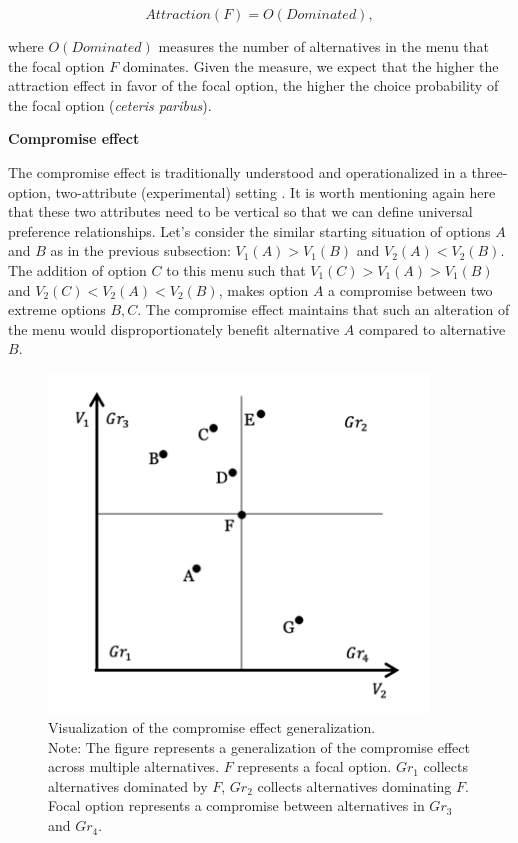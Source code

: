 \documentclass[a4paper,12pt]{article}
\begin{document}
$$Attraction(F)=O(Dominated),$$

where $O(Dominated)$ measures the number of alternatives in the menu that the focal option $F$ dominates. Given the measure, we expect that the higher the attraction effect in favor of the focal option, the higher the choice probability of the focal option (\textit{ceteris paribus}).

\textbf{Compromise effect}

The compromise effect is traditionally understood and operationalized in a three-option, two-attribute (experimental) setting \citep{simonson89, dharEtAl00}. It is worth mentioning again here that these two attributes need to be vertical so that we can define universal preference relationships. Let's consider the similar starting situation of options $A$ and $B$ as in the previous subsection: $V_1(A) > V_1(B)$ and $V_2(A) < V_2(B)$. The addition of option $C$ to this menu such that $V_1(C) > V_1(A) > V_1(B)$ and $V_2(C) < V_2(A) < V_2(B)$, makes option $A$ a compromise between two extreme options $B, C$. The compromise effect 
maintains that such an alteration of the menu would disproportionately benefit alternative $A$ compared to alternative $B$.

\begin{figure}[H]
    \centering
    \includegraphics[width=0.9\textwidth]{staticFiles/compromiseEffectZaksScatterPlot.png}
    \caption{Visualization of the compromise effect generalization.\\ Note: The figure represents a generalization of the compromise effect across multiple alternatives. $F$ represents a focal option. $Gr_1$ collects alternatives dominated by $F$, $Gr_2$ collects alternatives dominating $F$. Focal option represents a compromise between alternatives in $Gr_3$ and $Gr_4$.}
    \label{fig:compromiseZakVisualization}
\end{figure}
\end{document}
